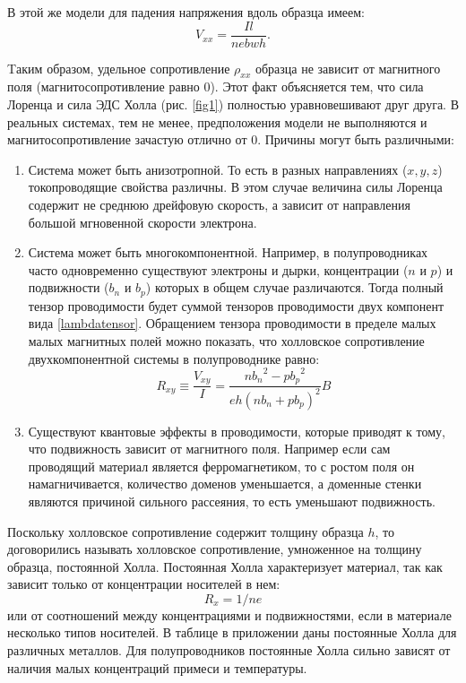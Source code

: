 \documentclass[a4paper,10pt,twoside]{article}
\begin{document}
В этой же модели для падения напряжения вдоль образца имеем:
\begin{equation}
V_{xx}=\frac{Il}{nebwh}.
\label{DiagonalVoltage}
\end{equation}

Tаким образом, удельное сопротивление $\rho_{xx}$ образца не зависит от магнитного поля (магнитосопротивление равно 0). Этот факт объясняется тем, что сила Лоренца и сила ЭДС Холла (рис. \ref{fig1}) полностью уравновешивают друг друга. В реальных системах, тем не менее, предположения модели не выполняются и магнитосопротивление зачастую отлично от 0. Причины могут быть различными:
\begin{enumerate}
\item{Система может быть анизотропной. То есть в разных направлениях ($x,y,z$) токопроводящие свойства различны. В этом случае величина силы Лоренца содержит не среднюю дрейфовую скорость, а зависит от направления большой мгновенной скорости электрона.}

\item{Система может быть многокомпонентной. Например, в полупроводниках часто одновременно существуют электроны и дырки, концентрации ($n$ и $p$) и подвижности ($b_n$ и $b_p$) которых в общем случае различаются. Тогда полный тензор проводимости будет суммой тензоров проводимости двух компонент вида \ref{lambdatensor}. Обращением тензора проводимости в пределе малых малых магнитных полей можно показать, что холловское сопротивление двухкомпонентной системы в полупроводнике равно:
      \begin{equation}
      R_{xy}\equiv \frac{V_{xy}}{I}=\frac{n{b_n}^2-p{b_p}^2}{eh(nb_n+pb_p)^2}B
      \label{halltwocomponents}
      \end{equation}
      }

\item{Существуют квантовые эффекты в проводимости, которые приводят к тому, что подвижность зависит от магнитного поля. Например если сам проводящий материал является ферромагнетиком, то с ростом поля он намагничивается, количество доменов уменьшается, а доменные стенки являются причиной сильного рассеяния, то есть уменьшают подвижность. }
\end{enumerate}

Поскольку холловское сопротивление содержит толщину образца $h$, то договорились называть холловское сопротивление, умноженное на толщину образца, постоянной Холла. Постоянная Холла характеризует материал, так как зависит только от концентрации носителей в нем:
$$
R_x=1/ne
$$
 или от соотношений между концентрациями и подвижностями, если в материале несколько типов носителей. В таблице в приложении даны постоянные Холла для различных металлов. Для полупроводников постоянные Холла сильно зависят от наличия малых концентраций примеси и температуры.
\end{document}

